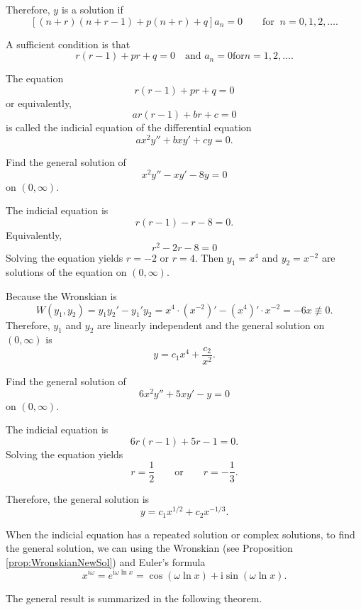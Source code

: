 Therefore, $y$ is a solution if
\[[(n+r)(n+r-1)+p(n+r)+q]a_n=0\qquad\text{for }~ n=0, 1, 2, \dots.\]

A sufficient condition is that
\[r(r-1)+pr+q=0
\quad\text{and } a_n=0 \text{for} n=1, 2, \dots.\]

The equation
\[r(r-1)+pr+q=0\]
or equivalently,
\[ar(r-1)+br+c=0\]
is called the indicial equation of the differential equation
\[ax^2y''+bxy'+cy=0.\]

\begin{example}
Find the general solution of
\[x^2y''-xy'-8y=0\]
on $(0,\infty)$.
\end{example}
\begin{solution}
The indicial equation is
\[r(r-1)-r-8=0.\]
Equivalently,
\[r^2-2r-8=0\]
Solving the equation yields
$r=-2$ or $r=4$.
Then $y_1=x^4$ and $y_2=x^{-2}$ are solutions of the equation on $(0,\infty)$.

Because the Wronskian is
\[W(y_1, y_2)=y_1y_2'-y_1'y_2=x^4\cdot(x^{-2})'-(x^4)'\cdot x^{-2}=-6x\not\equiv 0.\]
Therefore, $y_1$ and $y_2$ are linearly independent and the general solution on $(0,\infty)$ is
\[y=c_1x^4+\frac{c_2}{x^2}.\]
\end{solution}

\begin{exercise}
Find the general solution of
\[6x^2y''+5xy'-y=0\]
on $(0,\infty)$.
\end{exercise}
\begin{exersol}
The indicial equation is
\[6r(r-1)+5r-1=0.\]
Solving the equation yields
\[r=\frac12 \qquad\text{or}\qquad r=-\frac13.\]

Therefore, the general solution is
\[y=c_1x^{1/2}+c_2x^{-1/3}.\]
\end{exersol}

When the indicial equation has a repeated solution or complex solutions, to find the general solution, we can using the Wronskian (see Proposition \ref{prop:WronskianNewSol}) and Euler's formula 
\[x^{i \omega}=e^{\mathrm{i}\omega\ln x}=\cos(\omega\ln x) + \mathrm{i}\sin(\omega\ln x).\]

The general result is summarized in the following theorem.

